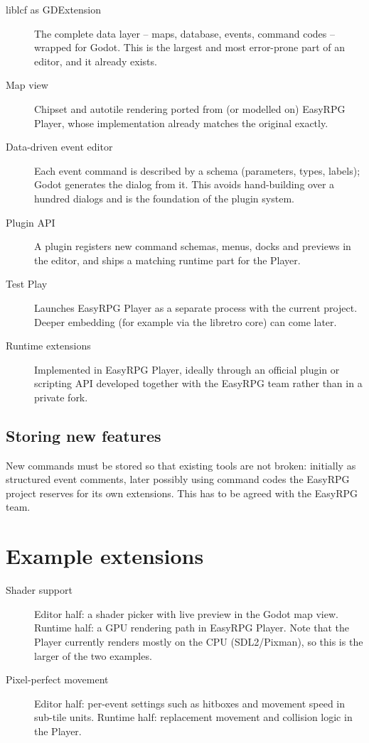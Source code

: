 \documentclass[11pt,a4paper]{article}
\begin{document}
\begin{description}
  \item[liblcf as GDExtension] The complete data layer -- maps, database, events,
        command codes -- wrapped for Godot. This is the largest and most error-prone
        part of an editor, and it already exists.
  \item[Map view] Chipset and autotile rendering ported from (or modelled on) EasyRPG
        Player, whose implementation already matches the original exactly.
  \item[Data-driven event editor] Each event command is described by a schema
        (parameters, types, labels); Godot generates the dialog from it. This avoids
        hand-building over a hundred dialogs and is the foundation of the plugin system.
  \item[Plugin API] A plugin registers new command schemas, menus, docks and previews
        in the editor, and ships a matching runtime part for the Player.
  \item[Test Play] Launches EasyRPG Player as a separate process with the current
        project. Deeper embedding (for example via the libretro core) can come later.
  \item[Runtime extensions] Implemented in EasyRPG Player, ideally through an official
        plugin or scripting API developed together with the EasyRPG team rather than in
        a private fork.
\end{description}

\subsection{Storing new features}

New commands must be stored so that existing tools are not broken: initially as
structured event comments, later possibly using command codes the EasyRPG project
reserves for its own extensions. This has to be agreed with the EasyRPG team.

\section{Example extensions}

\begin{description}
  \item[Shader support] Editor half: a shader picker with live preview in the Godot
        map view. Runtime half: a GPU rendering path in EasyRPG Player. Note that the
        Player currently renders mostly on the CPU (SDL2/Pixman), so this is the larger
        of the two examples.
  \item[Pixel-perfect movement] Editor half: per-event settings such as hitboxes and
        movement speed in sub-tile units. Runtime half: replacement movement and
        collision logic in the Player.
\end{description}
\end{document}
